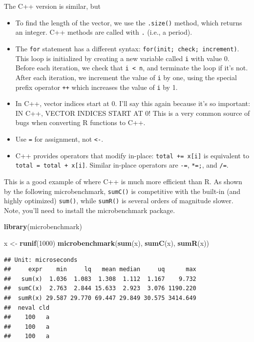 \documentclass[
]{krantz}
\newenvironment{Shaded}{\begin{snugshade}}{\end{snugshade}}
\newcommand{\DecValTok}[1]{\textcolor[rgb]{0.00,0.00,0.81}{#1}}
\newcommand{\KeywordTok}[1]{\textcolor[rgb]{0.13,0.29,0.53}{\textbf{#1}}}
\newcommand{\NormalTok}[1]{#1}
\newcommand{\StringTok}[1]{\textcolor[rgb]{0.31,0.60,0.02}{#1}}
\begin{document}
The C++ version is similar, but

\begin{itemize}
\item
  To find the length of the vector, we use the \texttt{.size()} method, which returns an integer. C++ methods are called with \texttt{.} (i.e., a period).
\item
  The \texttt{for} statement has a different syntax: \texttt{for(init;\ check;\ increment)}. This loop is initialized by creating a new variable called \texttt{i} with value 0. Before each iteration, we check that \texttt{i\ \textless{}\ n}, and terminate the loop if it's not. After each iteration, we increment the value of \texttt{i} by one, using the special prefix operator \texttt{++} which increases the value of \texttt{i} by 1.
\item
  In C++, vector indices start at 0. I'll say this again because it's so important: IN C++, VECTOR INDICES START AT 0! This is a very common source of bugs when converting R functions to C++.
\item
  Use \texttt{=} for assignment, not \texttt{\textless{}-}.
\item
  C++ provides operators that modify in-place: \texttt{total\ +=\ x{[}i{]}} is equivalent to \texttt{total\ =\ total\ +\ x{[}i{]}}. Similar in-place operators are \texttt{-=}, \texttt{*=;}, and \texttt{/=}.
\end{itemize}

This is a good example of where C++ is much more efficient than R. As shown by the following microbenchmark, \texttt{sumC()} is competitive with the built-in (and highly optimized) \texttt{sum()}, while \texttt{sumR()} is several orders of magnitude slower. Note, you'll need to install the microbenchmark package.

\begin{Shaded}
\begin{Highlighting}[]
\KeywordTok{library}\NormalTok{(microbenchmark)}

\NormalTok{x \textless{}{-}}\StringTok{ }\KeywordTok{runif}\NormalTok{(}\DecValTok{1000}\NormalTok{)}
\KeywordTok{microbenchmark}\NormalTok{(}\KeywordTok{sum}\NormalTok{(x), }\KeywordTok{sumC}\NormalTok{(x), }\KeywordTok{sumR}\NormalTok{(x))}
\end{Highlighting}
\end{Shaded}

\begin{verbatim}
## Unit: microseconds
##     expr    min     lq   mean median     uq      max
##   sum(x)  1.036  1.083  1.308  1.112  1.167    9.732
##  sumC(x)  2.763  2.844 15.633  2.923  3.076 1190.220
##  sumR(x) 29.587 29.770 69.447 29.849 30.575 3414.649
##  neval cld
##    100   a
##    100   a
##    100   a
\end{verbatim}
\end{document}
